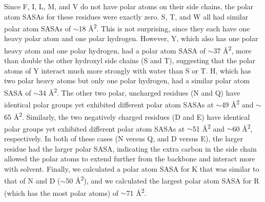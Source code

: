 Since F, I, L, M, and V do not have polar atoms on their side chains, the polar atom SASAs for these residues were exactly zero. 
S, T, and W all had similar polar atom SASAs of $\sim$18 \si{\angstrom^2}. 
This is not surprising, since they each have one heavy polar atom and one polar hydrogen. 
However, Y, which also has one polar heavy atom and one polar hydrogen, had a polar atom SASA of $\sim$37 \si{\angstrom^2}, more than double the other hydroxyl side chains (S and T), suggesting that the polar atoms of Y interact much more strongly with water than S or T. 
H, which has two polar heavy atoms but only one polar hydrogen, had a similar polar atom SASA of $\sim$34 \si{\angstrom^2}. 
The other two polar, uncharged residues (N and Q) have identical polar groups yet exhibited different polar atom SASAs at $\sim$49 \si{\angstrom^2} and $\sim$65 \si{\angstrom^2}. 
Similarly, the two negatively charged residues (D and E) have identical polar groups yet exhibited different polar atom SASAs at $\sim$51 \si{\angstrom^2} and $\sim$60 \si{\angstrom^2}, respectively. 
In both of these cases (N versus Q, and D versus E), the larger residue had the larger polar SASA, indicating the extra carbon in the side chain allowed the polar atoms to extend further from the backbone and interact more with solvent. 
Finally, we calculated a polar atom SASA for K that was similar to that of N and D ($\sim$50 \si{\angstrom^2}), and we calculated the largest polar atom SASA for R (which has the most polar atoms) of $\sim$71 \si{\angstrom^2}.

